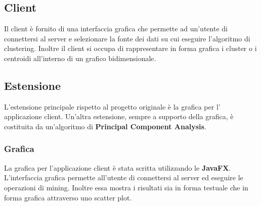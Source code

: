 \documentclass{article}
\begin{document}
	\subsection{Client}
	Il client è fornito di una interfaccia grafica che permette ad un'utente
	di connettersi al server e selezionare la fonte dei dati su cui eseguire
	l'algoritmo di clustering. Inoltre il client si occupa di rappresentare
	in forma grafica i cluster o i centroidi all'interno di un grafico
	bidimensionale.

	\subsection{Estensione}
	L'estensione principale rispetto al progetto originale è la grafica per
	l' applicazione client. Un'altra estensione, sempre a supporto della
	grafica, è costituita da un'algoritmo di \textbf{Principal Component
	Analysis}.

	\subsubsection{Grafica}
	La grafica per l'applicazione client è stata scritta utilizzando le
	\textbf{JavaFX}. L'interfaccia grafica permette all'utente di
	connettersi al server ed eseguire le operazioni di mining. Inoltre
	essa mostra i risultati sia in forma testuale che in forma grafica
	attraverso uno scatter plot.
\end{document}
